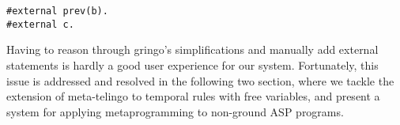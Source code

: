 \begin{lstlisting}[language=clingo,numbers=none]
#external prev(b).
#external c.
\end{lstlisting}

Having to reason through gringo's simplifications and manually add
external statements is hardly a good user experience for our
system. Fortunately, this issue is addressed and resolved in the
following two section, where we tackle the extension of meta-telingo
to temporal rules with free variables, and present a system for
applying metaprogramming to non-ground ASP programs.

